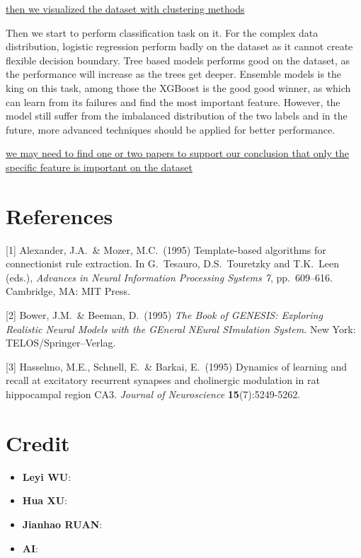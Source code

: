 \documentclass{article}
\begin{document}
\underline{then we visualized the dataset with clustering methods}

Then we start to perform classification task on it. For the complex data distribution, logistic regression perform badly on the dataset as it cannot create flexible decision boundary. Tree based models performs good on the dataset, as the performance will increase as the trees get deeper. Ensemble models is the king on this task, among those the XGBoost is the good good winner, as which can learn from its failures and find the most important feature. However, the model still suffer from the
imbalanced distribution of the two labels and in the future, more advanced techniques should be applied for better performance.

\underline{we may need to find one or two papers to support our conclusion that only the specific feature is important on the dataset}





\label{conclusion}

\section*{References}
{
\small


[1] Alexander, J.A.\ \& Mozer, M.C.\ (1995) Template-based algorithms for
connectionist rule extraction. In G.\ Tesauro, D.S.\ Touretzky and T.K.\ Leen
(eds.), {\it Advances in Neural Information Processing Systems 7},
pp.\ 609--616. Cambridge, MA: MIT Press.


[2] Bower, J.M.\ \& Beeman, D.\ (1995) {\it The Book of GENESIS: Exploring
  Realistic Neural Models with the GEneral NEural SImulation System.}  New York:
TELOS/Springer--Verlag.


[3] Hasselmo, M.E., Schnell, E.\ \& Barkai, E.\ (1995) Dynamics of learning and
recall at excitatory recurrent synapses and cholinergic modulation in rat
hippocampal region CA3. {\it Journal of Neuroscience} {\bf 15}(7):5249-5262.
}

\section*{Credit}
\begin{itemize}
    \item \textbf{Leyi WU}: 
    \item \textbf{Hua XU}: 
    \item \textbf{Jianhao RUAN}:
    \item \textbf{AI}:

\end{itemize}
\end{document}
